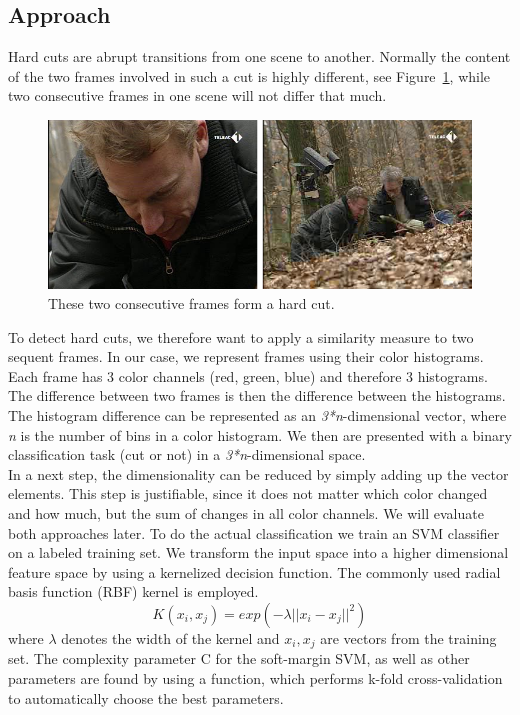 \subsection{Approach}
\label{sec:hard_cut_approach}

Hard cuts are abrupt transitions from one scene to another. 
Normally the content of the two frames involved in such a cut is highly different, see Figure~\ref{fig:hard_cut_example}, while two consecutive frames in one scene will not differ that much. 

\begin{figure}
	\centering
	\includegraphics[scale=.7]{images/hard_cut_example.png}
	\caption{These two consecutive frames form a hard cut.}
	\label{fig:hard_cut_example}
\end{figure}

To detect hard cuts, we therefore want to apply a similarity measure to two sequent frames. 
In our case, we represent frames using their color histograms. 
Each frame has 3 color channels (red, green, blue) and therefore 3 histograms.
The difference between two frames is then the difference between the histograms.
The histogram difference can be represented as an \emph{3*n}-dimensional vector, where \emph{n} is the number of bins in a color histogram. 
We then are presented with a binary classification task (cut or not) in a \emph{3*n}-dimensional space. \\
In a next step, the dimensionality can be reduced by simply adding up the vector elements. 
This step is justifiable, since it does not matter which color changed and how much, but the sum of changes in all color channels. 
We will evaluate both approaches later.
To do the actual classification we train an SVM classifier on a labeled training set.
We transform the input space into a higher dimensional feature space by using a kernelized decision function. The commonly used radial basis function (RBF) kernel is employed. 
$$K(x_i,x_j) = exp(-\lambda || x_i - x_j ||^2)$$ 
where $\lambda$ denotes the width of the kernel and $x_i, x_j $ are vectors from the training set. The complexity parameter C for the soft-margin SVM, as well as other parameters are found by using a function, which performs k-fold cross-validation to automatically choose the best parameters.
